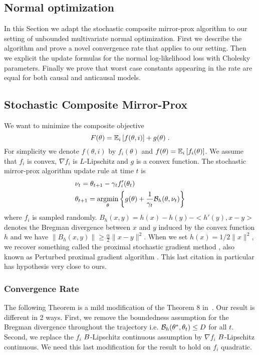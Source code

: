 \begin{subappendices}
\section{{Normal optimization}}
\label{apdx:normal_optimization}
In this Section we adapt the stochastic composite mirror-prox algorithm to our setting of unbounded multivariate normal optimization. 
First we describe the algorithm and prove a novel convergence rate that applies to our setting. 
Then we explicit the update formulas for the normal log-likelihood loss with Cholesky parameters. 
Finally we prove that worst case constants appearing in the rate are equal for both causal and anticausal models.

\subsection{Stochastic Composite Mirror-Prox}
\label{apdx:normal_conv_rate}

We want to minimize the composite objective 
\[
F(\theta) = \expect[i]{ f(\theta,i)} + g(\theta)\; .
\]
For simplicity we denote $f(\theta,i)$ by $f_i(\theta)$ and $f(\theta) = \expect[i]{f_i(\theta)}$. 
We assume that $f_i$ is convex, 
$\nabla f_i$ is  $L$-Lipschitz
and $g$ is a convex function. 
The stochastic mirror-prox algorithm update rule at time $t$ is 
\begin{align}
    &\nu_{t} = \theta_{t+1} - \gamma_t f'_i (\theta_t)\\
    & \theta_{t+1} = \argmin_{\theta}\left\{g(\theta)+\frac{1}{\gamma_t}\cB_{h}(\theta,\nu_t)\right\}
\end{align}
where $f_i$ is sampled randomly. $B_h(x,y)=h(x)-h(y)-<h'(y),x-y>$ denotes the Bregman divergence between $x$ and $y$ induced by the convex function $h$ and we have $\|B_h(x,y)\| \geq \frac{\alpha}{2} \|x-y\|^2$. When we set $h(x)= 1/2\|x\|^2$, we recover something called the proximal stochastic gradient method \citep{duchi2009efficient}, also known as Perturbed proximal gradient algorithm \citep{atchade2017perturbed}. 
This last citation in particular has hypothesis very close to ours. 

\subsubsection{Convergence Rate}
The following Theorem is a mild modification of the Theorem 8 in~\citep{duchi2010composite}.
Our result is different in 2 ways. 
First, we remove the boundedness assumption for the Bregman divergence throughout the trajectory i.e. $\cB_{h}(\theta^*,\theta_t) \leq D$ for all $t$.
Second, we replace the $f_i$ $\smoothness$-Lipschitz continuous assumption by $\nabla f_i$ $\smoothness$-Lipschitz continuous. 
We need this last modification for the result to hold on $f_i$ quadratic.


\end{subappendices}
